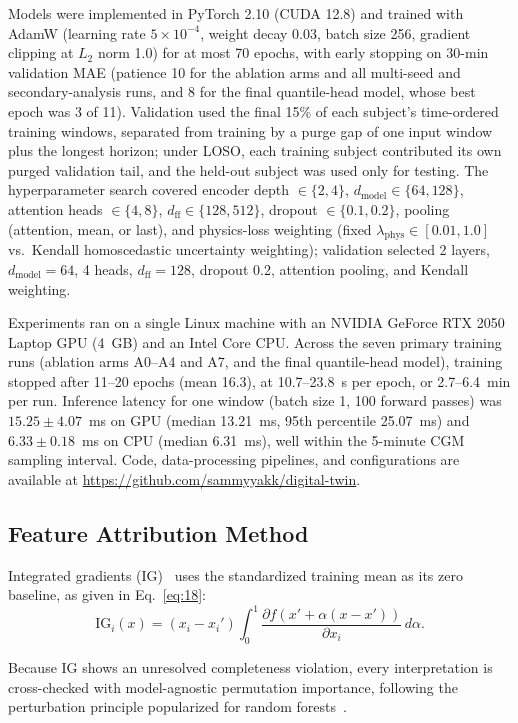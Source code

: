 \documentclass[journal]{IEEEtran}
\begin{document}
Models were implemented in PyTorch 2.10 (CUDA 12.8) and trained with AdamW (learning rate $5 \times 10^{-4}$, weight decay 0.03, batch size 256, gradient clipping at $L_2$ norm 1.0) for at most 70 epochs, with early stopping on 30-min validation MAE (patience 10 for the ablation arms and all multi-seed and secondary-analysis runs, and 8 for the final quantile-head model, whose best epoch was 3 of 11). Validation used the final 15\% of each subject's time-ordered training windows, separated from training by a purge gap of one input window plus the longest horizon; under LOSO, each training subject contributed its own purged validation tail, and the held-out subject was used only for testing. The hyperparameter search covered encoder depth $\in \{2, 4\}$, $d_{\text{model}} \in \{64, 128\}$, attention heads $\in \{4, 8\}$, $d_{\text{ff}} \in \{128, 512\}$, dropout $\in \{0.1, 0.2\}$, pooling (attention, mean, or last), and physics-loss weighting (fixed $\lambda_{\text{phys}} \in [0.01, 1.0]$ vs.\ Kendall homoscedastic uncertainty weighting); validation selected 2 layers, $d_{\text{model}} = 64$, 4 heads, $d_{\text{ff}} = 128$, dropout 0.2, attention pooling, and Kendall weighting.

Experiments ran on a single Linux machine with an NVIDIA GeForce RTX 2050 Laptop GPU (4~GB) and an Intel Core CPU. Across the seven primary training runs (ablation arms A0--A4 and A7, and the final quantile-head model), training stopped after 11--20 epochs (mean 16.3), at 10.7--23.8~s per epoch, or 2.7--6.4~min per run. Inference latency for one window (batch size 1, 100 forward passes) was $15.25 \pm 4.07$~ms on GPU (median 13.21~ms, 95th percentile 25.07~ms) and $6.33 \pm 0.18$~ms on CPU (median 6.31~ms), well within the 5-minute CGM sampling interval. Code, data-processing pipelines, and configurations are available at \url{https://github.com/sammyyakk/digital-twin}.

\subsection{Feature Attribution Method}

Integrated gradients (IG)~\cite{ref54} uses the standardized training mean as its zero baseline, as given in Eq.~\eqref{eq:18}:
\begin{equation}
\text{IG}_i(x) = (x_i - x_i') \int_0^1 \frac{\partial f(x' + \alpha(x - x'))}{\partial x_i}\, d\alpha.
\label{eq:18}
\end{equation}

Because IG shows an unresolved completeness violation, every interpretation is cross-checked with model-agnostic permutation importance, following the perturbation principle popularized for random forests~\cite{ref55}.
\end{document}
